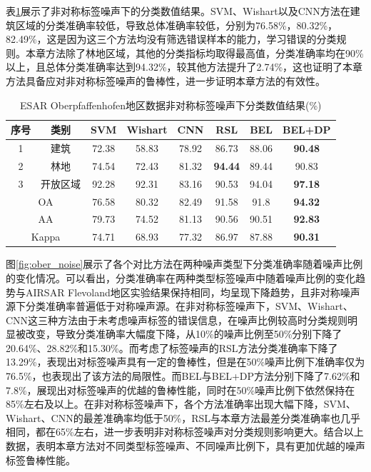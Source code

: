 表\ref{tab:ober_res_random}展示了非对称标签噪声下的分类数值结果。SVM、Wishart以及CNN方法在建筑区域的分类准确率较低，导致总体准确率较低，分别为76.58\%，80.32\%，82.49\%，这是因为这三个方法均没有筛选错误样本的能力，学习错误的分类规则。本章方法除了林地区域，其他的分类指标均取得最高值，分类准确率均在90\%以上，且总体分类准确率达到94.32\%，较其他方法提升了2.74\%，这也证明了本章方法具备应对非对称标签噪声的鲁棒性，进一步证明本章方法的有效性。
\begin{table}[ht!]
  \caption{ESAR Oberpfaffenhofen地区数据非对称标签噪声下分类数值结果(\%)}
  \label{tab:ober_res_random}
  \begin{tabular}{cccccccc}
    \toprule[1.5bp]
    序号                        & 类别    & SVM   & Wishart & CNN   & RSL            & BEL            & BEL+DP         \\
    \midrule[0.75bp]
    1                         & 建筑    & 72.38 & 58.83   & 78.92 & 86.73          & 88.06          & \textbf{90.48} \\
    2                         & 林地    & 74.54 & 72.43   & 81.32 & \textbf{94.44} & 89.44          & 90.83          \\
    3                         & 开放区域  & 92.28 & 92.31   & 83.16 & 90.53          & 94.04          & \textbf{97.18} \\
    \midrule[0.75bp]
    \multicolumn{2}{c}{OA}    & 76.58 & 80.32 & 82.49   & 91.58 & 91.8           & \textbf{94.32}                  \\
    \multicolumn{2}{c}{AA}    & 79.73 & 74.52 & 81.13   & 90.56 & 90.51          & \textbf{92.83}                  \\
    \multicolumn{2}{c}{Kappa} & 74.71 & 68.93 & 77.32   & 86.97 & 87.88          & \textbf{90.31}                  \\
    \bottomrule[0.75bp]
  \end{tabular}
\end{table}

图\ref{fig:ober_noise}展示了各个对比方法在两种噪声类型下分类准确率随着噪声比例的变化情况。可以看出，分类准确率在两种类型标签噪声中随着噪声比例的变化趋势与AIRSAR Flevoland地区实验结果保持相同，均呈现下降趋势，且非对称噪声源下分类准确率普遍低于对称噪声源。在非对称标签噪声下，SVM、Wishart、CNN这三种方法由于未考虑噪声标签的错误信息，在噪声比例较高时分类规则明显被改变，导致分类准确率大幅度下降，从10\%的噪声比例至50\%分别下降了20.64\%、28.82\%和15.30\%。而考虑了标签噪声的RSL方法分类准确率下降了13.29\%，表现出对标签噪声具有一定的鲁棒性，但是在50\%噪声比例下准确率仅为76.5\%，也表现出了该方法的局限性。而BEL与BEL+DP方法分别下降了7.62\%和7.8\%，展现出对标签噪声的优越的鲁棒性能，同时在50\%噪声比例下依然保持在85\%左右及以上。在非对称标签噪声下，各个方法准确率出现大幅下降，SVM、Wishart、CNN的最差准确率均低于50\%，RSL与本章方法最差分类准确率也几乎相同，都在65\%左右，进一步表明非对称标签噪声对分类规则影响更大。结合以上数据，表明本章方法对不同类型标签噪声、不同噪声比例下，具有更加优越的噪声标签鲁棒性能。

